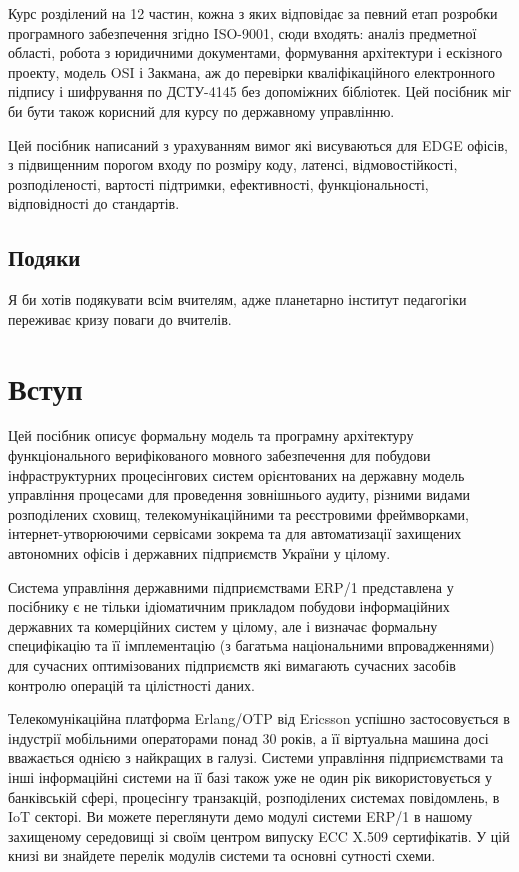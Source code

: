 Курс розділений на 12 частин, кожна з яких відповідає за певний
етап розробки програмного забезпечення згідно ISO-9001, сюди входять:
аналіз предметної області, робота з юридичними документами, формування
архітектури і ескізного проекту, модель OSI і Закмана, аж до перевірки
кваліфікаційного електронного підпису і шифрування по ДСТУ-4145 без
допоміжних бібліотек. Цей посібник міг би бути також корисний
для курсу по державному управлінню.

Цей посібник написаний з урахуванням вимог які висуваються для EDGE офісів,
з підвищенним порогом входу по розміру коду, латенсі, відмовостійкості,
розподіленості, вартості підтримки, ефективності, функціональності,
відповідності до стандартів.

\section*{Подяки}

Я би хотів подякувати всім вчителям, адже планетарно інститут
педагогіки переживає кризу поваги до вчителів.

\chapter{Вступ}

Цей посібник описує формальну модель та програмну архітектуру
функціонального верифікованого мовного забезпечення
для побудови інфраструктурних процесінгових систем
орієнтованих на державну модель управління
процесами для проведення зовнішнього аудиту,
різними видами розподілених сховищ,
телекомунікаційними та реєстровими фреймворками,
інтернет-утворюючими сервісами зокрема та для
автоматизації захищених автономних офісів і
державних підприємств України у цілому.

Система управління державними підприємствами ERP/1 представлена у
посібнику є не тільки ідіоматичним прикладом побудови інформаційних державних та комерційних систем у цілому,
але і визначає формальну специфікацію та її імплементацію (з багатьма національними впровадженнями)
для сучасних оптимізованих підприємств які вимагають сучасних засобів контролю операцій та цілістності даних.

Телекомунікаційна платформа Erlang/OTP від Ericsson успішно застосовується
в індустрії мобільними операторами понад 30 років, а її віртуальна машина
досі вважається однією з найкращих в галузі. Системи управління підприємствами та інші інформаційні системи
на її базі також уже не один рік використовується у банківській сфері, процесінгу транзакцій,
розподілених системах повідомлень, в IoT секторі. Ви можете переглянути демо
модулі системи ERP/1 в нашому захищеному середовищі зі своїм центром
випуску ECC X.509 сертифікатів. У цій книзі ви знайдете перелік модулів
системи та основні сутності схеми.

